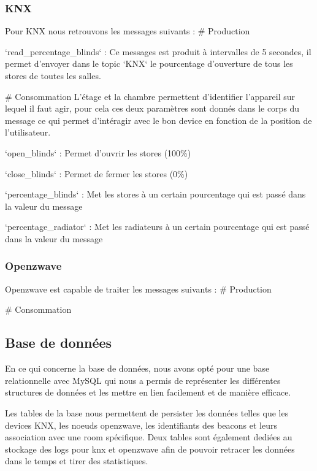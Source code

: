 \subsubsection{KNX}
Pour KNX nous retrouvons les messages suivants : 
# Production
    \item `read_percentage_blinds` : Ce messages est produit à intervalles de 5 secondes, il permet d'envoyer dans le topic `KNX` le pourcentage d'ouverture de tous les stores de toutes les salles. 

# Consommation
    L'étage et la chambre permettent d'identifier l'appareil sur lequel il faut agir, pour cela ces deux paramètres sont donnés dans le corps du message ce qui permet d'intéragir avec le bon device en fonction de la position de l'utilisateur.
    \item `open_blinds` : Permet d'ouvrir les stores (100\%)
    \item `close_blinds` : Permet de fermer les stores (0\%)
    \item `percentage_blinds` : Met les stores à un certain pourcentage qui est passé dans la valeur du message
    \item `percentage_radiator` : Met les radiateurs à un certain pourcentage qui est passé dans la valeur du message

\subsubsection{Openzwave}
Openzwave est capable de traiter les messages suivants : 
# Production
    \item

# Consommation
    \item

\subsection{Base de données}
En ce qui concerne la base de données, nous avons opté pour une base relationnelle avec MySQL qui nous a permis de représenter les différentes structures de données et les mettre en lien facilement et de manière efficace.

Les tables de la base nous permettent de persister les données telles que les devices KNX, les noeuds openzwave, les identifiants des beacons et leurs association avec une room spécifique. Deux tables sont également dediées au stockage des logs pour knx et openzwave afin de pouvoir retracer les données dans le temps et tirer des statistiques.

